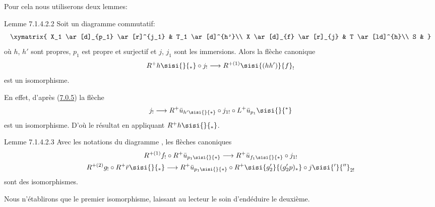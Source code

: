 \documentclass[10pt]{../fichiers-configuration-latex/smfart}
\begin{document}
Pour cela nous utiliserons deux lemmes:

\begin{enonce*}{Lemme 7.1.4.2.2}
Soit un diagramme commutatif:
\[
\xymatrix{
X_1    \ar[d]_{p_1}     \ar[r]^{j_1} & T_1 \ar[d]^{h'}\\
X    \ar[d]_{f}       \ar[r]_{j}           & T \ar[ld]^{h}\\
    S       &
}
\]
où $h$, $h'$ sont propres, $p_{1}$ est propre et surjectif et $j$,
$j_{1}$ sont les immersions. Alors la flèche canonique
\[
R^{+}h\sisi{}{_*}\circ j_{!}\longrightarrow R^{+(1)}\sisi{(hh')}{f}_{!}
\]
est un isomorphisme.
\end{enonce*}

En effet, d'après (\hyperref[XVII.constru7.0.5]{7.0.5}) la flèche
\[
j_{!}\longrightarrow R^{+}\bar{u}_{h'\sisi{}{*}}\circ j_{1!}\circ
L^{+}\bar{u}_{p_{1}}\sisi{}{^*}
\]
est un isomorphisme. D'où le résultat en appliquant $R^{+}h\sisi{}{_*}$.

\begin{enonce*}{Lemme 7.1.4.2.3}
Avec les notations du diagramme \emph{}, les flèches
canoniques
\begin{gather*}
R^{+(1)}f_{!}\circ R^{+}\bar{u}_{p_{1}\sisi{}{*}}\longrightarrow
R^{+}\bar{u}_{f_{1}\sisi{}{*}}\circ j_{1!}\\
R^{+(2)}g_{!}\circ R^{+}\bar{r}\sisi{}{_*}\longrightarrow
R^{+}\bar{u}_{p_{1}\sisi{}{*}}\circ R^{+}\sisi{g'_{2}}{(g_2'p)_*}\circ j\sisi{'}{''}_{2!}
\end{gather*}
sont des isomorphismes.
\end{enonce*}

Nous n'établirons que le premier isomorphisme, laissant au lecteur le
soin d'en\pageoriginale déduire le deuxième.
\end{document}
